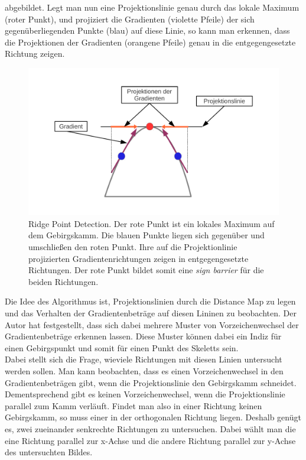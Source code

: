 abgebildet. Legt man nun eine Projektionslinie genau durch das lokale Maximum (roter Punkt), und projiziert die Gradienten (violette Pfeile) der sich gegenüberliegenden Punkte (blau) auf diese Linie, so kann man erkennen, dass die Projektionen der Gradienten (orangene Pfeile) genau in die entgegengesetzte Richtung zeigen.\
\begin{figure}
\centering
\includegraphics[width=1.0\linewidth]{./fig/paper_ridge_point_detection.pdf}
\caption{Ridge Point Detection. Der rote Punkt ist ein lokales Maximum auf dem Gebirgskamm. Die blauen Punkte liegen sich
gegenüber und umschließen den roten Punkt. Ihre auf die Projektionlinie projizierten Gradientenrichtungen zeigen in entgegengesetzte Richtungen. Der rote Punkt bildet somit eine \emph{sign barrier} für die beiden Richtungen.}
\label{fig:paper_ridge_point_detection}
\end{figure}
Die Idee des Algorithmus ist, Projektionslinien durch die Distance Map zu legen und das Verhalten der Gradientenbeträge
auf diesen Lininen zu beobachten. Der Autor hat festgestellt, dass sich dabei mehrere Muster von Vorzeichenwechsel der
Gradientenbeträge erkennen lassen. Diese Muster können dabei ein Indiz für einen Gebirgspunkt und somit für einen Punkt des Skeletts sein. \\
Dabei stellt sich die Frage, wieviele Richtungen mit diesen Linien untersucht werden sollen. Man kann beobachten, dass es
einen Vorzeichenwechsel in den Gradientenbeträgen gibt, wenn die Projektionslinie den Gebirgskamm schneidet. Dementsprechend 
gibt es keinen Vorzeichenwechsel, wenn die Projektionslinie parallel zum Kamm verläuft. Findet man also in einer Richtung
keinen Gebirgskamm, so muss einer in der orthogonalen Richtung liegen. Deshalb genügt es, zwei zueinander senkrechte Richtungen
zu untersuchen. Dabei wählt man die eine Richtung parallel zur x-Achse und die andere Richtung parallel zur y-Achse des untersuchten Bildes.
